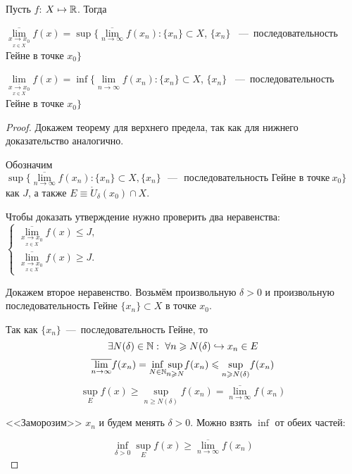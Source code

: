 \begin{theorem}
    Пусть $f$: $X \mapsto \mathbb{R}$. Тогда 
\begin{center}
    $ \overline{\lim\limits_{\underset{x \in X}{x\to x_0}}} f(x) = \sup \{ \overline{\lim\limits_{n\to \infty}} f(x_{n}): \{x_{n}\} \subset X$, $\{{x_n}\}$ ~---~последовательность  Гейне в точке $x_{0}\}$
\end{center}    

 \begin{center}
    $ \lim\limits_{\overline{\underset{x \in X}{x\to x_0}}} f(x) = \inf \{ \lim\limits_{\overline{n\to \infty}} f(x_{n}): \{x_{n}\} \subset X$, $\{{x_n}\}$ ~---~последовательность  Гейне в точке $x_{0}\}$
\end{center}    
\end{theorem}
\begin{proof}
    Докажем теорему для верхнего предела, так как для нижнего доказательство аналогично.

    Обозначим $ \sup \{ \overline{\lim\limits_{n\to \infty}} f(x_{n}): \{x_{n}\} \subset X, \{x_{n}\} \textrm{ ~---~ последовательность  Гейне в точке}\  x_{0}\}$ как $J$, а также $E \equiv    \mathring{U}_{\delta} (x_{0}) \cap X$.

    Чтобы доказать утверждение нужно проверить два неравенства: 
    $\begin{cases}
         \overline{\lim\limits_{\underset{x \in X}{x\to x_0}}} f(x) \leq J, \\
          \overline{\lim\limits_{\underset{x \in X}{x\to x_0}}} f(x) \geq J.
    \end{cases} $

    Докажем второе неравенство. Возьмём произвольную $\delta > 0$ и произвольную последовательность Гейне $\{x_{n}\} \subset X$ в точке $x_{0}$.

    Так как $\{x_{n}\}$~---~последовательность Гейне, то
    $$ \exists N(\delta) \in \N: \ \forall n \geq N(\delta) \hookrightarrow x_{n} \in E$$
    $$ \overline{\lim\limits_{n \to \infty}} f(x_{n}) = \underset{N \in \mathbb{N}}{\inf} \underset{n \geqslant N}{\sup} f(x_{n}) \leqslant \underset{n \geqslant N(\delta)}{\sup} f(x_{n})
    $$
    $$ \underset{E}{\sup} f(x) \geq \underset{n \geq N(\delta)}{\sup} f(x_{n}) = \overline{\lim\limits_{n \to \infty}} f(x_{n}) $$

    <<Заморозим>> $x_{n}$ и будем менять $\delta > 0$. Можно взять $\inf$ от обеих частей:

    $$ \underset{\delta > 0}{\inf} \underset{E}{\sup} f(x) \geq \overline{\lim\limits_{n \to \infty}} f(x_{n})
    $$


\end{proof}
